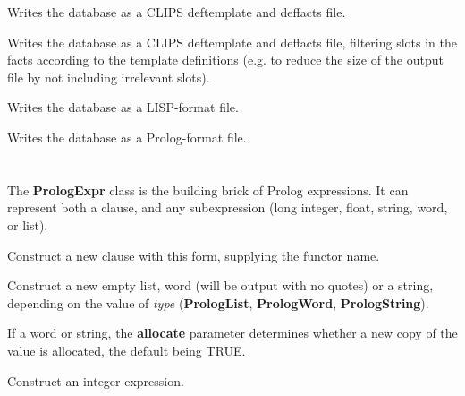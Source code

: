 Writes the database as a CLIPS deftemplate and deffacts file.



Writes the database as a CLIPS deftemplate and deffacts file, filtering
slots in the facts according to the template definitions (e.g. to reduce
the size of the output file by not including irrelevant slots).



Writes the database as a LISP-format file.

\label{databasewriteprolog}


Writes the database as a Prolog-format file.

\section{}

The {\bf PrologExpr} class is the building brick of Prolog expressions.
It can represent both a clause, and any subexpression (long integer, float, string, word,
or list).



Construct a new clause with this form, supplying the functor name.


Construct a new empty list, word (will be output with no quotes) or a string, depending on the
value of {\it type} ({\bf PrologList}, {\bf PrologWord}, {\bf PrologString}).

If a word or string, the {\bf allocate} parameter determines whether a new copy of the
value is allocated, the default being TRUE.


Construct an integer expression.


